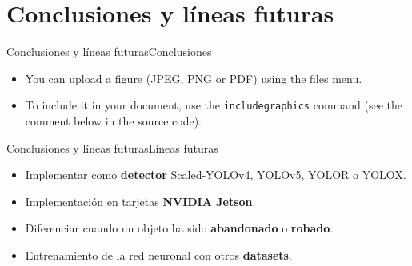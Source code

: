 \section{Conclusiones y líneas futuras}
\begin{frame}{Conclusiones y líneas futuras}{Conclusiones}

\begin{itemize}
  \justifying
  \item You can upload a figure (JPEG, PNG or PDF) using the files menu. 
  \item To include it in your document, use the \texttt{includegraphics} command (see the comment below in the source code).
\end{itemize}

\end{frame}


\begin{frame}{Conclusiones y líneas futuras}{Líneas futuras}

\begin{itemize}
  \setlength\itemsep{2em}
  \justifying
  \item Implementar como \textbf{detector} Scaled-YOLOv4, YOLOv5, YOLOR o YOLOX. 
  \item Implementación en tarjetas \textbf{NVIDIA Jetson}.
  \item Diferenciar cuando un objeto ha sido \textbf{abandonado} o \textbf{robado}.
  \item Entrenamiento de la red neuronal con otros \textbf{datasets}.
\end{itemize}

\end{frame}